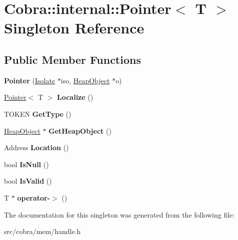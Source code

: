 \hypertarget{class_cobra_1_1internal_1_1_pointer}{\section{Cobra\+:\+:internal\+:\+:Pointer$<$ T $>$ Singleton Reference}
\label{class_cobra_1_1internal_1_1_pointer}
}
\subsection*{Public Member Functions}
\begin{DoxyCompactItemize}
\item 
\hypertarget{class_cobra_1_1internal_1_1_pointer_ac9b3cef02e1b11b4ac31679058d7a409}{{\bfseries Pointer} (\hyperlink{class_cobra_1_1internal_1_1_isolate}{Isolate} $\ast$iso, \hyperlink{struct_cobra_1_1internal_1_1_heap_object}{Heap\+Object} $\ast$o)}\label{class_cobra_1_1internal_1_1_pointer_ac9b3cef02e1b11b4ac31679058d7a409}

\item 
\hypertarget{class_cobra_1_1internal_1_1_pointer_ab0fa35b2a68d37b39e2c8eb90e1fd37d}{\hyperlink{class_cobra_1_1internal_1_1_pointer}{Pointer}$<$ T $>$ {\bfseries Localize} ()}\label{class_cobra_1_1internal_1_1_pointer_ab0fa35b2a68d37b39e2c8eb90e1fd37d}

\item 
\hypertarget{class_cobra_1_1internal_1_1_pointer_ac2ae83ab929fff74d79da7a3377d1d29}{T\+O\+K\+E\+N {\bfseries Get\+Type} ()}\label{class_cobra_1_1internal_1_1_pointer_ac2ae83ab929fff74d79da7a3377d1d29}

\item 
\hypertarget{class_cobra_1_1internal_1_1_pointer_a99ac5a006f18eaaf80ee255139cd9bc0}{\hyperlink{struct_cobra_1_1internal_1_1_heap_object}{Heap\+Object} $\ast$ {\bfseries Get\+Heap\+Object} ()}\label{class_cobra_1_1internal_1_1_pointer_a99ac5a006f18eaaf80ee255139cd9bc0}

\item 
\hypertarget{class_cobra_1_1internal_1_1_pointer_a42e6999edf1e77e85719904e9ae1a31e}{Address {\bfseries Location} ()}\label{class_cobra_1_1internal_1_1_pointer_a42e6999edf1e77e85719904e9ae1a31e}

\item 
\hypertarget{class_cobra_1_1internal_1_1_pointer_a728326ccf9d3ab1a6ca064794b569404}{bool {\bfseries Is\+Null} ()}\label{class_cobra_1_1internal_1_1_pointer_a728326ccf9d3ab1a6ca064794b569404}

\item 
\hypertarget{class_cobra_1_1internal_1_1_pointer_a69b92f36c9d8a92c1f41e6bf84b3fe67}{bool {\bfseries Is\+Valid} ()}\label{class_cobra_1_1internal_1_1_pointer_a69b92f36c9d8a92c1f41e6bf84b3fe67}

\item 
\hypertarget{class_cobra_1_1internal_1_1_pointer_a5423999dc918fd23167413003c27ab1e}{T $\ast$ {\bfseries operator-\/$>$} ()}\label{class_cobra_1_1internal_1_1_pointer_a5423999dc918fd23167413003c27ab1e}

\end{DoxyCompactItemize}


The documentation for this singleton was generated from the following file\+:\begin{DoxyCompactItemize}
\item 
src/cobra/mem/handle.\+h\end{DoxyCompactItemize}
